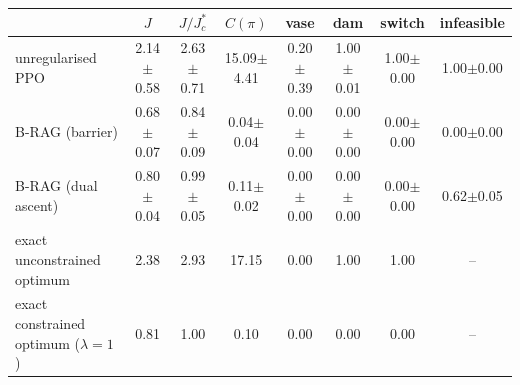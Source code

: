 \begin{tabular}{lccccccc}
\toprule
 & $J$ & $J/J^*_c$ & $C(\pi)$ & vase & dam & switch & infeasible \\
\midrule
unregularised PPO & 2.14$\pm$0.58 & 2.63$\pm$0.71 & 15.09$\pm$4.41 & 0.20$\pm$0.39 & 1.00$\pm$0.01 & 1.00$\pm$0.00 & 1.00$\pm$0.00 \\
B-RAG (barrier) & 0.68$\pm$0.07 & 0.84$\pm$0.09 & 0.04$\pm$0.04 & 0.00$\pm$0.00 & 0.00$\pm$0.00 & 0.00$\pm$0.00 & 0.00$\pm$0.00 \\
B-RAG (dual ascent) & 0.80$\pm$0.04 & 0.99$\pm$0.05 & 0.11$\pm$0.02 & 0.00$\pm$0.00 & 0.00$\pm$0.00 & 0.00$\pm$0.00 & 0.62$\pm$0.05 \\
\midrule
exact unconstrained optimum & 2.38 & 2.93 & 17.15 & 0.00 & 1.00 & 1.00 & -- \\
exact constrained optimum ($\lambda{=}1$) & 0.81 & 1.00 & 0.10 & 0.00 & 0.00 & 0.00 & -- \\
\bottomrule
\end{tabular}
